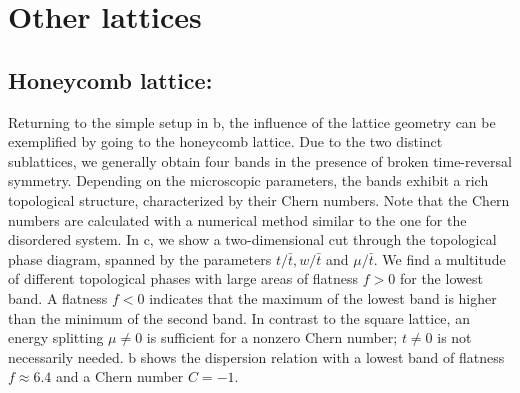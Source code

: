\section{Other lattices}

\subsection{Honeycomb lattice:}
Returning to the simple setup in b, the influence of the lattice geometry can be exemplified by going to the honeycomb lattice.
Due to the two distinct sublattices, we generally obtain four bands in the presence of broken time-reversal symmetry.
Depending on the microscopic parameters, the bands exhibit a rich topological structure, characterized by their Chern numbers.
Note that the Chern numbers are calculated with a numerical method similar to the one for the disordered system.
In c, we show a two-dimensional cut through the topological phase diagram, spanned by the parameters $t/\bar{t}, w/\bar{t}$ and $\mu/\bar{t}$.
We find a multitude of different topological phases with large areas of flatness $f > 0$ for the lowest band.
A flatness $f < 0$ indicates that the maximum of the lowest band is higher than the minimum of the second band.
In contrast to the square lattice, an energy splitting $\mu \ne 0$ is sufficient for a nonzero Chern number; $t\ne 0$ is not necessarily needed.
b shows the dispersion relation with a lowest band of flatness $f\approx 6.4$ and a Chern number $C=-1$.


